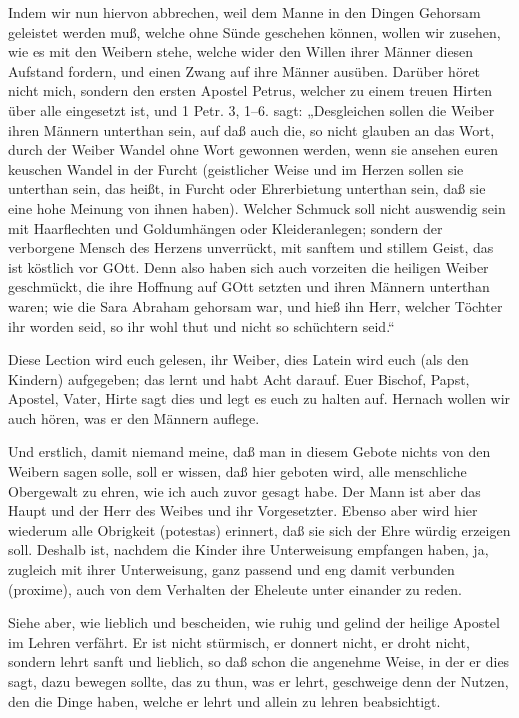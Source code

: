 Indem wir nun hiervon abbrechen, weil dem Manne in den Dingen Gehorsam geleistet werden muß, welche ohne Sünde geschehen können, wollen wir zusehen, wie es mit den Weibern stehe, welche wider den Willen ihrer Männer diesen Aufstand fordern, und einen Zwang auf ihre Männer ausüben. Darüber höret nicht mich, sondern den ersten Apostel Petrus, welcher zu einem treuen Hirten über alle eingesetzt ist, und 1 Petr. 3, 1–6. sagt: „Desgleichen sollen die Weiber ihren Männern unterthan sein, auf daß auch die, so nicht glauben an das Wort, durch der Weiber Wandel ohne Wort gewonnen werden, wenn sie ansehen euren keuschen Wandel in der Furcht (geistlicher Weise und im Herzen sollen sie unterthan sein, das heißt, in Furcht oder Ehrerbietung unterthan sein, daß sie eine hohe Meinung von ihnen haben). Welcher Schmuck soll nicht auswendig sein mit Haarflechten und Goldumhängen oder Kleideranlegen; sondern der verborgene Mensch des Herzens unverrückt, mit sanftem und stillem Geist, das ist köstlich vor GOtt. Denn also haben sich auch vorzeiten die heiligen Weiber geschmückt, die ihre Hoffnung auf GOtt setzten und ihren Männern unterthan waren; wie die Sara Abraham gehorsam war, und hieß ihn Herr, welcher Töchter ihr worden seid, so ihr wohl thut und nicht so schüchtern seid.“

Diese Lection wird euch gelesen, ihr Weiber, dies Latein wird euch (als den Kindern) aufgegeben; das lernt und habt Acht darauf. Euer Bischof, Papst, Apostel, Vater, Hirte sagt dies und legt es euch zu halten auf. Hernach wollen wir auch hören, was er den Männern auflege.

Und erstlich, damit niemand meine, daß man in diesem Gebote nichts von den Weibern sagen solle, soll er wissen, daß hier geboten wird, alle menschliche Obergewalt zu ehren, wie ich auch zuvor gesagt habe. Der Mann ist aber das Haupt und der Herr des Weibes und ihr Vorgesetzter. Ebenso aber wird hier wiederum alle Obrigkeit (potestas) erinnert, daß sie sich der Ehre würdig erzeigen soll. Deshalb ist, nachdem die Kinder ihre Unterweisung empfangen haben, ja, zugleich mit ihrer Unterweisung, ganz passend und eng damit verbunden (proxime), auch von dem Verhalten der Eheleute unter einander zu reden.

Siehe aber, wie lieblich und bescheiden, wie ruhig und gelind der heilige Apostel im Lehren verfährt. Er ist nicht stürmisch, er donnert nicht, er droht nicht, sondern lehrt sanft und lieblich, so daß schon die angenehme Weise, in der er dies sagt, dazu bewegen sollte, das zu thun, was er lehrt, geschweige denn der Nutzen, den die Dinge haben, welche er lehrt und allein zu lehren beabsichtigt.

